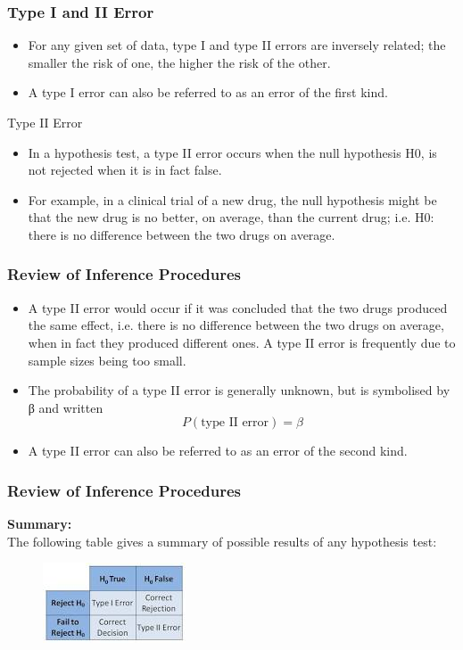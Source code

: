 \documentclass{beamer}
\begin{document}
\begin{frame}
\frametitle{Type I and II Error}
\large
\begin{itemize}
	\item For any given set of data, type I and type II errors are inversely
	related; the smaller the risk of one, the higher the risk of the other.
	\item A type I error can also be referred to as an error of the first kind.
\end{itemize}
	Type II Error
\begin{itemize}
	\item In a hypothesis test, a type II error occurs when the null hypothesis
	H0, is not rejected when it is in fact false. 
	\item For example, in a clinical
	trial of a new drug, the null hypothesis might be that the new drug
	is no better, on average, than the current drug; i.e.
	H0: there is no difference between the two drugs on average.
\end{itemize}

\end{frame}
\begin{frame}
	\frametitle{Review of Inference Procedures}
	\large
	\begin{itemize}
\item A type II error would occur if it was concluded that the two drugs
produced the same effect, i.e. there is no difference between the
two drugs on average, when in fact they produced different ones.
A type II error is frequently due to sample sizes being too small.
\item The probability of a type II error is generally unknown, but is
symbolised by β and written
\[P(\mbox{type II error}) = \beta\]
\item A type II error can also be referred to as an error of the second
kind.
\end{itemize}
\end{frame}
\begin{frame}
\frametitle{Review of Inference Procedures}
\large

\textbf{Summary:}\\
The following table gives a summary of possible results of any
hypothesis test:
\begin{figure}
\centering
\includegraphics[width=0.6\linewidth]{ErrorTypeTable}

\end{figure}


\end{frame}
\end{document}
